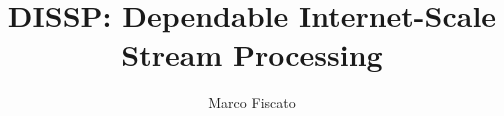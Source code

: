 \documentclass[a4paper,11pt,twoside,openright]{report}
\begin{document}
\title{\LARGE {\bf DISSP: Dependable Internet-Scale Stream Processing}\\
 \vspace*{6mm}
}

\author{Marco Fiscato}


\normallinespacing
\maketitle

%
%
%
%

\body
%

%
%
%
%





\end{document}
